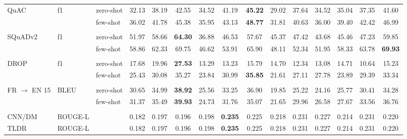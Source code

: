 \documentclass{article}
\begin{document}
\begin{table}[t]
\begin{tabular}{lll<{\hspace{0.8 ex}}>{\hspace{0.8 ex}}ccc<{\hspace{0.8 ex}}>{\hspace{0.8 ex}}ccc<{\hspace{0.8 ex}}>{\hspace{0.8 ex}}ccc<{\hspace{0.8 ex}}>{\hspace{0.8 ex}}ccc<{\hspace{0.8 ex}}}
    QuAC                   & f1          & zero-shot     & 32.13 & 38.19 & 42.55 &  34.52 &  41.19 & \textbf{45.22} &  29.02 & 37.64 & 34.52 &  35.04 &  37.35 & 41.60 \\
                           &             & few-shot      & 36.02 & 41.78 & 45.38 &  35.95 &  43.13 & \textbf{48.77} &  31.81 & 40.63 & 36.00 &  39.40 &  42.42 & 46.99 \\
                           &             &               &       &       &       &        &        &       &        &       &       &        &        &       \\
    SQuADv2                & f1          & zero-shot     & 51.97 & 58.66 & \textbf{64.30} &  36.88 &  46.53 & 57.67 &  45.37 & 47.42 & 43.68 &  45.46 &  47.23 & 59.85 \\
                           &             & few-shot      & 58.86 & 62.33 & 69.75 &  46.62 &  53.91 & 65.90 &  48.11 & 52.34 & 51.95 &  58.33 &  63.78 & \textbf{69.93}  \\
                           &             &               &       &       &       &        &        &       &        &       &       &        &        &       \\
    DROP                   & f1          & zero-shot     & 17.68 & 19.96 & \textbf{27.53} &  13.29 &  13.23 & 15.79 &  14.70 & 12.34 & 13.08 &  14.71 &  10.64 & 15.23 \\
                           &             & few-shot      & 25.43 & 30.08 & 35.27 &  23.84 &  30.99 & \textbf{35.85} &  21.61 & 27.11 & 27.78 &  23.89 &  29.39 & 33.34 \\
                           &             &               &       &       &       &        &        &       &        &       &       &        &        &       \\
    FR $\rightarrow$ EN 15 & BLEU        & zero-shot     & 30.65 & 34.99 & \textbf{38.92} &  25.56 &  33.25 & 36.90 &  19.85 & 25.22 & 24.16 &  25.77 &  30.41 & 34.28 \\
                           &             & few-shot      & 31.37 & 35.49 & \textbf{39.93} &  24.73 &  31.76 & 35.07 &  21.65 & 29.96 & 26.58 &  27.67 &  33.56 & 36.76 \\
                           &             &               &       &       &       &        &        &       &        &       &       &        &        &       \\
    CNN/DM                 & ROUGE-L     &               & 0.182 & 0.197 & 0.196 &  0.198 & \textbf{0.235} & 0.225 &  0.218 & 0.231 & 0.227 &  0.214 &  0.231 & 0.220 \\
    TLDR                   & ROUGE-L     &               & 0.182 & 0.197 & 0.196 &  0.198 & \textbf{0.235} & 0.225 &  0.218 & 0.231 & 0.227 &  0.214 &  0.231 & 0.220 \\
    \bottomrule
\end{tabular}

\setlength{\savedtabcolsep}{\tabcolsep}

\end{table}
\end{document}
